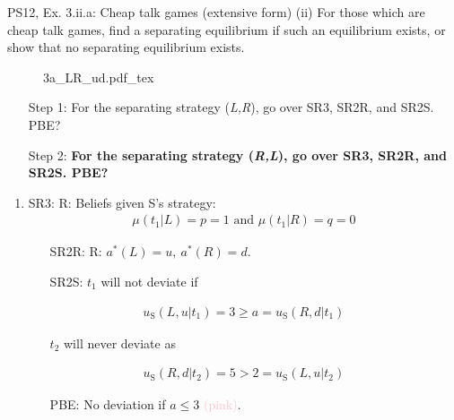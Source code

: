 \begin{frame}{PS12, Ex. 3.ii.a: Cheap talk games (extensive form)}
    (ii) For those which are cheap talk games, find a separating equilibrium if such an equilibrium exists, or show that no separating equilibrium exists.\vspace{-6pt}
    \begin{multicols}{2}
      \begin{figure}[!h]
        \center{}
        {3a_LR_ud.pdf_tex}
      \end{figure}\vspace{-6pt}
      \begin{itemize}
        \item[Step 1:] For the separating strategy (\textit{L,R}), go over SR3, SR2R, and SR2S. PBE?
        \item[Step 2:] \textbf{For the separating strategy (\textit{R,L}), go over SR3, SR2R, and SR2S. PBE?}
      \end{itemize}
      \vfill\null\columnbreak
      \begin{enumerate}
        \item SR3: R: Beliefs given S's strategy:\vspace{-8pt}
        \begin{align*}
          \mu(t_1|L)=p=1\text{ and }\mu(t_1|R)=q=0
        \end{align*}\vspace{-18pt}
        \begin{itemize}\normalsize
          \item[SR2R:] R: $a^*(L)=u,\ a^*(R)=d$.
          \item[SR2S:] $t_1$ will not deviate if
        \end{itemize}\vspace{-10pt}
        \begin{align*}
          u_\text{S}(L,u|t_1)=3\geq a=u_\text{S}(R,d|t_1)
        \end{align*}\vspace{-18pt}
        \begin{itemize}\normalsize
          \item[] $t_2$ will never deviate as
        \end{itemize}\vspace{-10pt}
        \begin{align*}
          u_\text{S}(R,d|t_2)=5>2=u_\text{S}(L,u|t_2)
        \end{align*}\vspace{-18pt}
        \begin{itemize}\normalsize
          \item[PBE:] No deviation if $a\leq3$ \textcolor{Pink}{(pink)}.
        \end{itemize}
      \end{enumerate}
      \vfill\null
    \end{multicols}
\end{frame}

